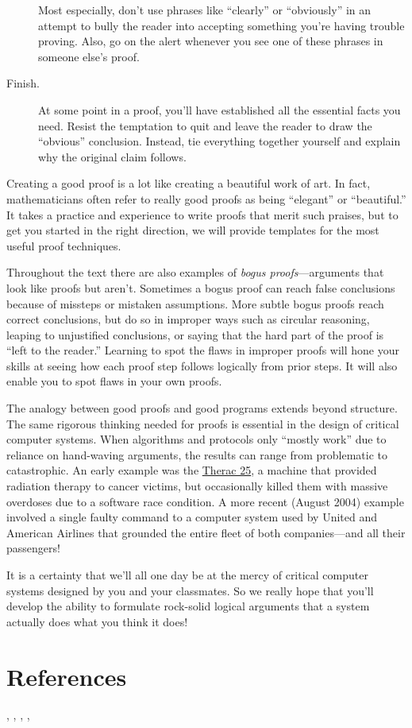 \begin{description}
  Most especially, don't use phrases like ``clearly'' or ``obviously'' in
  an attempt to bully the reader into accepting something you're having
  trouble proving.  Also, go on the alert whenever you see one of these
  phrases in someone else's proof.

\item[Finish.]  At some point in a proof, you'll have established all the
essential facts you need.  Resist the temptation to quit and leave the
reader to draw the ``obvious'' conclusion.  Instead, tie everything
together yourself and explain why the original claim follows.

\end{description}

Creating a good proof is a lot like creating a beautiful work of art.  In
fact, mathematicians often refer to really good proofs as being
``elegant'' or ``beautiful.''  It takes a practice and experience to write
proofs that merit such praises, but to get you started in
the right direction, we will provide templates for the most useful proof
techniques.

Throughout the text there are also examples of \emph{bogus proofs}---arguments 
that look like proofs but aren't.  Sometimes a bogus
proof can reach false conclusions because of missteps or mistaken
assumptions.  More subtle bogus proofs reach correct conclusions, but
do so in improper ways such as circular reasoning, leaping to
unjustified conclusions, or saying that the hard part of the
proof is ``left to the reader.''  Learning to spot the flaws in improper
proofs will hone your skills at seeing how each proof step follows
logically from prior steps.  It will also enable you to spot flaws in
your own proofs.

The analogy between good proofs and good programs extends beyond
structure.  The same rigorous thinking needed for proofs is essential in
the design of critical computer systems.  When algorithms and protocols
only ``mostly work'' due to reliance on hand-waving arguments, the results
can range from problematic to catastrophic.  An early example was the
\href{http://sunnyday.mit.edu/papers/therac.pdf}{Therac 25}, 
a machine that provided radiation therapy to cancer victims,
but occasionally killed them with massive overdoses due to a software race
condition.  A more recent (August 2004) example involved a single faulty
command to a computer system used by United and American Airlines that
grounded the entire fleet of both companies---and all their passengers!

It is a certainty that we'll all one day be at the mercy of critical
computer systems designed by you and your classmates.  So we really
hope that you'll develop the ability to formulate rock-solid logical
arguments that a system actually does what you think it does!

\section{References}

\cite{Cupillari12}, \cite{AignerG99}, \cite{Velleman1994}, \cite{Fagin1995}, \cite{Gelfond34}

\endinput
